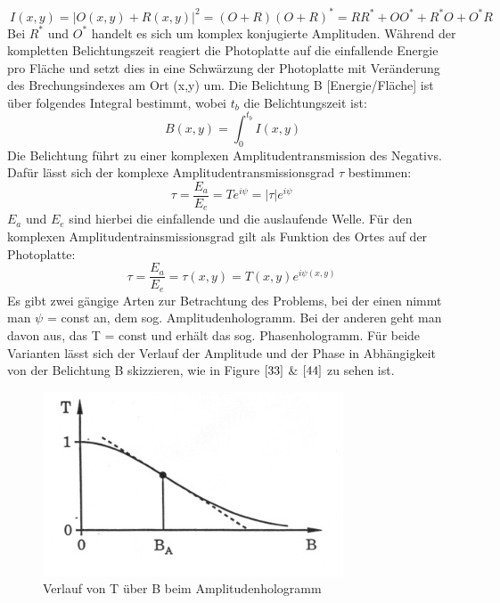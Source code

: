\documentclass[12pt,a4paper]{article}
\begin{document}
\begin{equation}
\ I(x,y) = |O(x,y) + R(x,y)|^{2} = (O+R)(O+R)^{*} = RR^{*} + OO^{*} + R^{*}O + O^{*}R
\label {1}
\end{equation}
Bei $R^{*}$ und $ O^{*}$ handelt es sich um komplex konjugierte Amplituden. Während der kompletten Belichtungszeit reagiert die Photoplatte auf die einfallende Energie pro Fläche und setzt dies in eine Schwärzung der Photoplatte mit Veränderung des Brechungsindexes am Ort (x,y) um. Die Belichtung B [Energie/Fläche] ist über folgendes Integral bestimmt, wobei $t_{b}$ die Belichtungszeit ist:
\begin{equation}
\ B(x,y) = \int_{0}^{t_{b}}I(x,y) 
\label {1}
\end{equation}
Die Belichtung führt zu einer komplexen Amplitudentransmission des Negativs. Dafür lässt sich der komplexe Amplitudentransmissionsgrad $\tau$ bestimmen:
\begin{equation}
\tau = \frac{E_{a}}{E_e}  = Te^{i\psi} = |\tau|e^{i\psi}
\label {1}
\end{equation}
$E_{a}$ und $E_{e}$ sind hierbei die einfallende und die auslaufende Welle. Für den komplexen Amplitudentrainsmissionsgrad gilt als Funktion des Ortes auf der Photoplatte:
\begin{equation}
\tau = \frac{E_{a}}{E_e} = \tau(x,y) = T(x,y)e^{i\psi(x,y)} 
\label {1}
\end{equation}
Es gibt zwei gängige Arten zur Betrachtung des Problems, bei der einen nimmt man $\psi$ = const an, dem sog. Amplitudenhologramm. Bei der anderen geht man davon aus, das T = const und erhält das sog. Phasenhologramm. Für beide Varianten lässt sich der Verlauf der Amplitude und der Phase in Abhängigkeit von der Belichtung B skizzieren, wie in Figure $\ref{33}$ $\&$ $\ref{44}$ zu sehen ist.
\begin{figure}[h]
	\includegraphics[scale = 0.5]{Amptrans.png}
	\centering
	\caption{Verlauf von T über B beim Amplitudenhologramm}
	\label{33}
\end{figure}
\end{document}
